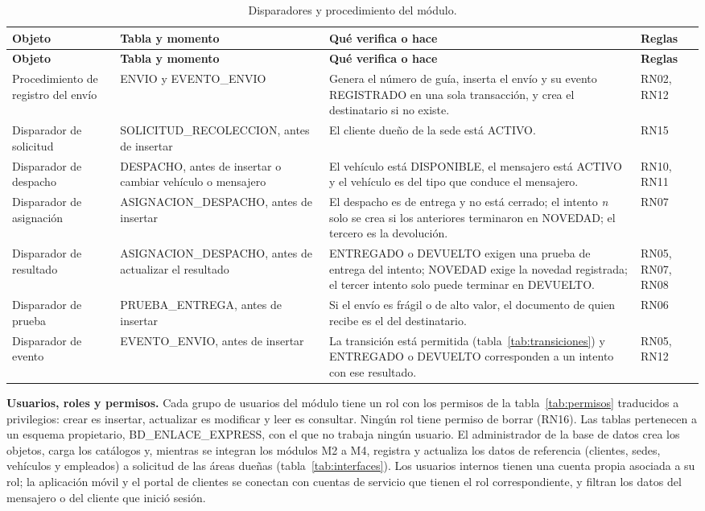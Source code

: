 {\singlespacing\small
\begin{longtable}{L{4.0cm} L{3.4cm} L{5.4cm} L{1.4cm}}
\caption{Disparadores y procedimiento del módulo.}
\label{tab:disparadores}\\
\toprule
\textbf{Objeto} & \textbf{Tabla y momento} & \textbf{Qué verifica o hace} & \textbf{Reglas} \\
\midrule
\endfirsthead
\toprule
\textbf{Objeto} & \textbf{Tabla y momento} & \textbf{Qué verifica o hace} & \textbf{Reglas} \\
\midrule
\endhead
\bottomrule
\endfoot
Procedimiento de registro del envío & ENVIO y EVENTO\_ENVIO & Genera el número de guía, inserta el envío y su evento REGISTRADO en una sola transacción, y crea el destinatario si no existe. & RN02, RN12 \\
Disparador de solicitud & SOLICITUD\_RECOLECCION, antes de insertar & El cliente dueño de la sede está ACTIVO. & RN15 \\
Disparador de despacho & DESPACHO, antes de insertar o cambiar vehículo o mensajero & El vehículo está DISPONIBLE, el mensajero está ACTIVO y el vehículo es del tipo que conduce el mensajero. & RN10, RN11 \\
Disparador de asignación & ASIGNACION\_DESPACHO, antes de insertar & El despacho es de entrega y no está cerrado; el intento \textit{n} solo se crea si los anteriores terminaron en NOVEDAD; el tercero es la devolución. & RN07 \\
Disparador de resultado & ASIGNACION\_DESPACHO, antes de actualizar el resultado & ENTREGADO o DEVUELTO exigen una prueba de entrega del intento; NOVEDAD exige la novedad registrada; el tercer intento solo puede terminar en DEVUELTO. & RN05, RN07, RN08 \\
Disparador de prueba & PRUEBA\_ENTREGA, antes de insertar & Si el envío es frágil o de alto valor, el documento de quien recibe es el del destinatario. & RN06 \\
Disparador de evento & EVENTO\_ENVIO, antes de insertar & La transición está permitida (tabla~\ref{tab:transiciones}) y ENTREGADO o DEVUELTO corresponden a un intento con ese resultado. & RN05, RN12 \\
\end{longtable}
\par}

\textbf{Usuarios, roles y permisos.} Cada grupo de usuarios del módulo
tiene un rol con los permisos de la tabla~\ref{tab:permisos} traducidos a
privilegios: crear es insertar, actualizar es modificar y leer es
consultar. Ningún rol tiene permiso de borrar (RN16). Las tablas
pertenecen a un esquema propietario, BD\_ENLACE\_EXPRESS, con el que no
trabaja ningún usuario. El administrador de la base de datos crea los objetos,
carga los catálogos y, mientras se integran los módulos M2 a M4,
registra y actualiza los datos de referencia (clientes, sedes,
vehículos y empleados) a solicitud de las áreas dueñas
(tabla~\ref{tab:interfaces}). Los usuarios internos tienen una cuenta propia
asociada a su rol; la aplicación móvil y el portal de clientes se
conectan con cuentas de servicio que tienen el rol correspondiente, y
filtran los datos del mensajero o del cliente que inició sesión.

